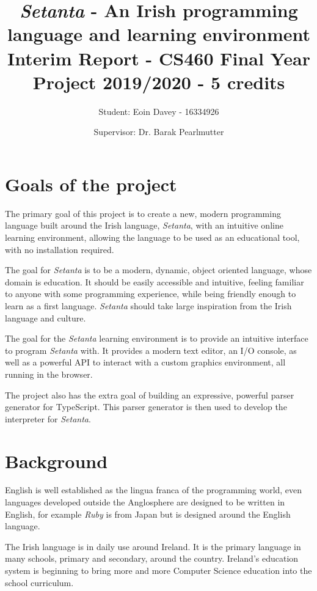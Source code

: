 \documentclass[11pt]{extarticle}
\newcommand{\Setanta}{\emph{Setanta}}
\begin{document}
    \title{
    \LARGE \textbf{\Setanta{} - An Irish programming language and learning environment}\\
    \Large Interim Report - CS460 Final Year Project 2019/2020 - 5 credits}
    \author{\Large Student: Eoin Davey - 16334926 \and \Large Supervisor: Dr. Barak Pearlmutter}
    \maketitle
    \section{Goals of the project}

        The primary goal of this project is to create a new, modern programming language built around the Irish language, \Setanta{}, with an intuitive online learning environment, allowing the language to be used as an educational tool, with no installation required.

        The goal for \Setanta{} is to be a modern, dynamic, object oriented language, whose domain is education. It should be easily accessible and intuitive, feeling familiar to anyone with some programming experience, while being friendly enough to learn as a first language. \Setanta{} should take large inspiration from the Irish language and culture.

        The goal for the \Setanta{} learning environment is to provide an intuitive interface to program \Setanta{} with. It provides a modern text editor, an I/O console, as well as a powerful API to interact with a custom graphics environment, all running in the browser.

        The project also has the extra goal of building an expressive, powerful parser generator for TypeScript. This parser generator is then used to develop the interpreter for \Setanta{}.

    \section{Background}

        English is well established as the lingua franca of the programming world, even languages developed outside the Anglosphere are designed to be written in English, for example \emph{Ruby} is from Japan but is designed around the English language.
        
        The Irish language is in daily use around Ireland. It is the primary language in many schools, primary and secondary, around the country. Ireland's education system is beginning to bring more and more Computer Science education into the school curriculum.
        
\end{document}
